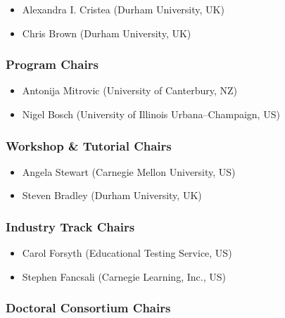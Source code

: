 \documentclass[letterpaper,11pt,oneside]{book} %
\providecommand{\tightlist}{%
  \setlength{\itemsep}{0pt}\setlength{\parskip}{0pt}}
\begin{document}
\begin{itemize}
\tightlist
\item
  Alexandra I. Cristea (Durham University, UK)
\item
  Chris Brown (Durham University, UK)
\end{itemize}

\subsubsection{Program Chairs}%

\begin{itemize}
\tightlist
\item
  Antonija Mitrovic (University of Canterbury, NZ)
\item
  Nigel Bosch (University of Illinois Urbana--Champaign, US)
\end{itemize}

\subsubsection{Workshop \& Tutorial
Chairs}%

\begin{itemize}
\tightlist
\item
  Angela Stewart (Carnegie Mellon University, US)
\item
  Steven Bradley (Durham University, UK)
\end{itemize}

\subsubsection{Industry Track Chairs}%

\begin{itemize}
\tightlist
\item
  Carol Forsyth (Educational Testing Service, US)
\item
  Stephen Fancsali (Carnegie Learning, Inc., US)
\end{itemize}

\subsubsection{Doctoral Consortium
Chairs}%
\end{document}
